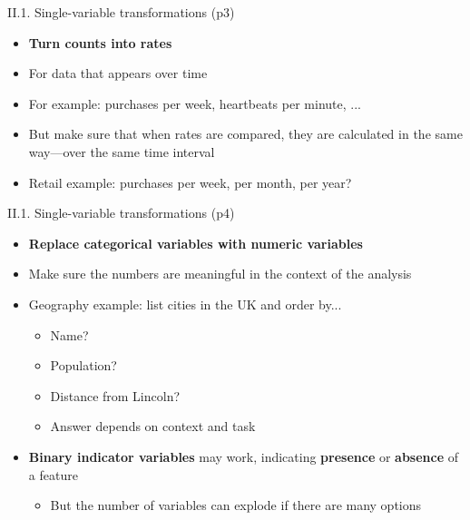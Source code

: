 \documentclass[handout]{beamer}
\newcommand{\strong}[1]{\textbf{\color{teal} #1}}
\newcommand{\stronger}[1]{\textbf{\color{purple} #1}}
\begin{document}
\begin{frame}{II.1. Single-variable transformations (p3)}
\begin{itemize}
\item[] \strong{Turn counts into rates}
\item For data that appears over time
\item For example: purchases per week, heartbeats per minute, ...
\item But make sure that when rates are compared, they are calculated in the same way---over the same time interval
\item Retail example: purchases per week, per month, per year?
\end{itemize}
\end{frame}
\begin{frame}{II.1. Single-variable transformations (p4)}
\begin{itemize}
\item[] \strong{Replace categorical variables with numeric variables}
\item Make sure the numbers are meaningful in the context of the analysis
\item Geography example: list cities in the UK and order by...
	\begin{itemize}
	\item Name? 
	\item Population? 
	\item Distance from Lincoln?
	\item Answer depends on context and task
	\end{itemize}
\item \stronger{Binary indicator variables} may work, indicating \strong{presence} or \strong{absence} of a feature
	\begin{itemize}
	\item But the number of variables can explode if there are many options
	\end{itemize}
\end{itemize}
\end{frame}
\end{document}
